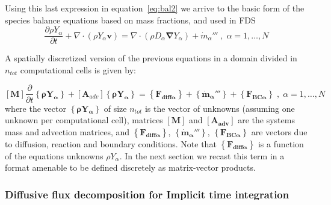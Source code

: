 \documentclass[12pt]{article}
\begin{document}
Using this last expression in equation~\eqref{eq:bal2} we arrive to the basic form of the species balance equations based on mass fractions, and used in FDS
%
\begin{equation}
   \frac{\partial \rho Y_\alpha}{ \partial t} + \nabla \cdot ( \rho Y_\alpha  \mathbf{v} ) = \nabla \cdot ( \rho D_\alpha \boldsymbol{\nabla} Y_\alpha ) + \dot{m}_\alpha''' \; , \; \alpha=1,\dots,N \label{eq:bal3}
\end{equation}
%

A spatially discretized version of the previous equations in a domain divided in $n_{tot}$ computational cells is given by:

%
\begin{equation}
\left[ \mathbf{M} \right] \frac{\partial}{\partial t} \left\{ \mathbf{\rho Y_\alpha} \right\} + \left[ \mathbf{A}_{adv}  \right] \left\{ \mathbf{\rho Y_\alpha} \right\} = \left\{ \mathbf{F_{diff \alpha}} \right\} + \left\{  \mathbf{\dot{m}_\alpha'''} \right\} +  \left\{ \mathbf{F_{BC \alpha}} \right\} \; , \; \alpha=1,\dots,N \label{eq:discbal3}
\end{equation}
%
where the vector $\left\{ \mathbf{\rho Y_\alpha} \right\}$ of size $n_{tot}$ is the vector of unknowns (assuming one unknown per computational cell), matrices $\left[ \mathbf{M} \right]$ and $ \left[ \mathbf{A_{adv}}  \right]$ are the systems mass and advection matrices, and $\left\{ \mathbf{F_{diff \alpha}} \right\}$, $\left\{  \mathbf{\dot{m}_\alpha'''} \right\}$, $\left\{ \mathbf{F_{BC \alpha}} \right\}$ are vectors due to diffusion, reaction and boundary conditions. Note that $\left\{ \mathbf{F_{diff \alpha}} \right\}$ is a function of the equations unknowns $\rho Y_\alpha$. In the next section we recast this term in a format amenable to be defined discretely as matrix-vector products.


\subsubsection*{Diffusive flux decomposition for Implicit time integration}
\end{document}
